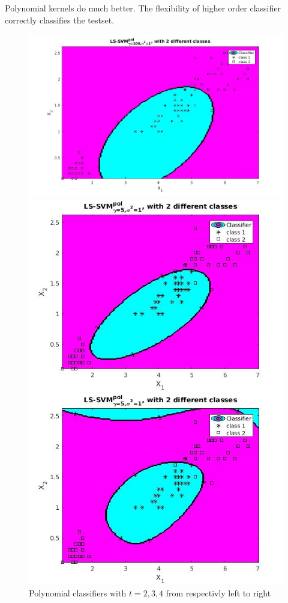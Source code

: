 \documentclass[•]{article}
\begin{document}
Polynomial kernels do much better. The flexibility of higher order classifier correctly classifies the testset.
\begin{figure}[h!]
\centering
\begin{minipage}{.3\textwidth}
\includegraphics[width=.8\textwidth]{13fig1.jpg}
\end{minipage}
\begin{minipage}{.3\textwidth}
\includegraphics[width=.8\textwidth]{13fig2.jpg}
\end{minipage}
\begin{minipage}{.3\textwidth}
\includegraphics[width=.8\textwidth]{13fig3.jpg}
\end{minipage}
\caption{Polynomial classifiers with $t=2,3,4$ from respectivly left to right}
\end{figure}
\end{document}

